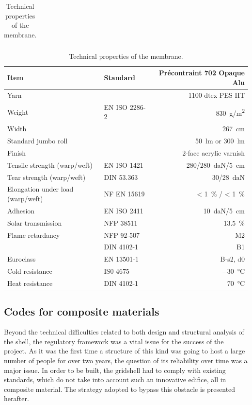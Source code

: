 \begin{table}[p]
\begin{fullpage}
\begin{tabular}{@{}l l r @{}}
	\bottomrule
	\end{tabular}
	\caption{Technical properties of the tube.}
	\label{tab:tube}
	\vspace{1.25cm}
 	\begin{tabular}{@{}l l r @{}}
	\toprule
	Item 							& Standard 				& Précontraint 702 Opaque Alu  \\
	\midrule
	Yarn 							& 						& 1100 dtex PES HT \\
	Weight 						& EN ISO 2286-2			& \SI{830}{g/m^2} \\
	Width 						& 						& \SI{267}{cm} \\
	Standard jumbo roll				& 						& \SI{50}{lm} or \SI{300}{lm}  \\
	Finish						& 						& 2-face acrylic varnish \\
	\midrule
	Tensile strength (warp/weft)		& EN ISO  1421			& \SI{280/280}{daN/ \SI{5}{\cm}} \\
	Tear strength (warp/weft)			& DIN 53.363				& \SI{30/28}{daN} \\
	Elongation under load (warp/weft)	& NF EN 15619				& < \SI{1}{\percent} / < \SI{1}{\percent} \\
	Adhesion						& EN ISO  2411			& \SI{10}{daN/ \SI{5}{\cm}} \\
	Solar transmission				& NFP 38511				& \SI{13.5}{\percent}  \\
	\midrule
	Flame retardancy				& NFP 92-507 				& M2 \\
								& DIN 4102-1 				& B1 \\
	Euroclass						& EN 13501-1 				& B-s2, d0 \\
	\midrule
	Cold resistance					& IS0 4675 				& \SI{-30}{\celsius} \\
	Heat resistance					& DIN 4102-1 				& \SI{+70}{\celsius} \\
	\bottomrule
	\end{tabular}
	\caption{Technical properties of the membrane.}
	\label{tab:membrane}
\end{fullpage}
\end{table}

\subsection{Codes for composite materials}\label{sec:codes}
Beyond the technical difficulties related to both design and structural analysis of the shell, the regulatory framework was a vital issue for the success of the project. As it was the first time a structure of this kind was going to host a large number of people for over two years, the question of its reliability over time was a major issue. In order to be built, the gridshell had to comply with existing standards, which do not take into account such an innovative edifice, all in composite material. The strategy adopted to bypass this obstacle is presented herafter.

